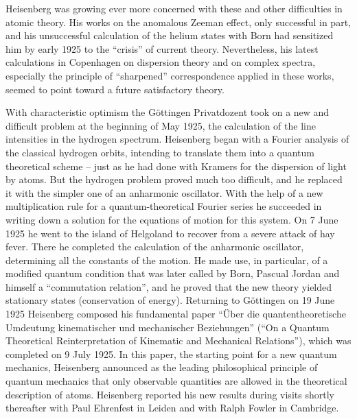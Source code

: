 \documentclass{article}
\begin{document}
Heisenberg was growing ever more concerned with these and other difficulties in atomic theory. His works on the anomalous Zeeman effect, only successful in part, and his unsuccessful calculation of the helium states with Born had sensitized him by early 1925 to the “crisis” of current theory. Nevertheless, his latest calculations in Copenhagen on dispersion theory and on complex spectra, especially the principle of “sharpened” correspondence applied in these works, seemed to point toward a future satisfactory theory.

With characteristic optimism the Göttingen Privatdozent took on a new and difficult problem at the beginning of May 1925, the calculation of the line intensities in the hydrogen spectrum. Heisenberg began with a Fourier analysis of the classical hydrogen orbits, intending to translate them into a quantum theoretical scheme – just as he had done with Kramers for the dispersion of light by atoms. But the hydrogen problem proved much too difficult, and he replaced it with the simpler one of an anharmonic oscillator. With the help of a new multiplication rule for a quantum-theoretical Fourier series he succeeded in writing down a solution for the equations of motion for this system. On 7 June 1925 he went to the island of Helgoland to recover from a severe attack of hay fever. There he completed the calculation of the anharmonic oscillator, determining all the constants of the motion. He made use, in particular, of a modified quantum condition that was later called by Born, Pascual Jordan and himself a “commutation relation”, and he proved that the new theory yielded stationary states (conservation of energy). Returning to Göttingen on 19 June 1925 Heisenberg composed his fundamental paper “Über die quantentheoretische Umdeutung kinematischer und mechanischer Beziehungen” (“On a Quantum Theoretical Reinterpretation of Kinematic and Mechanical Relations”), which was completed on 9 July 1925. In this paper, the starting point for a new quantum mechanics, Heisenberg announced as the leading philosophical principle of quantum mechanics that only observable quantities are allowed in the theoretical description of atoms. Heisenberg reported his new results during visits shortly thereafter with Paul Ehrenfest in Leiden and with Ralph Fowler in Cambridge.
\end{document}
